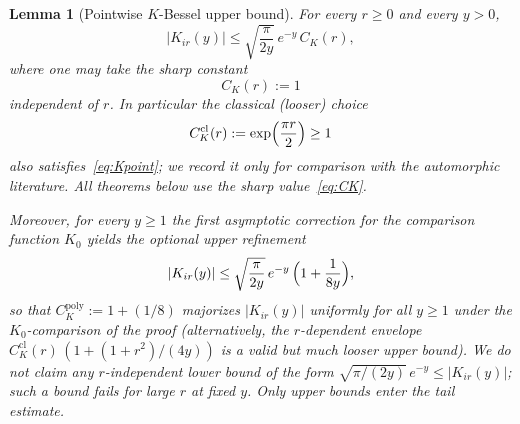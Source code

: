 \documentclass[11pt]{amsart}
\newtheorem{lemma}[theorem]{Lemma}
\theoremstyle{definition}
\newcommand{\abs}[1]{\lvert#1\rvert}
\begin{document}
\begin{lemma}[Pointwise $K$-Bessel upper bound]
\label{lem:Kpoint}
For every $r\ge 0$ and every $y>0$,
\begin{equation}
\label{eq:Kpoint}
  \abs{K_{ir}(y)}
  \le
  \sqrt{\frac{\pi}{2y}}\,e^{-y}\,C_K(r),
\end{equation}
where one may take the sharp constant
\begin{equation}
\label{eq:CK}
  C_K(r)
  :=
  1
\end{equation}
independent of $r$.  In particular the classical (looser) choice
\begin{equation}
\label{eq:CKclass}
  C_K^{\mathrm{cl}}(r)
  :=
  \exp\Bigl(\frac{\pi r}{2}\Bigr)
  \ge 1
\end{equation}
also satisfies~\eqref{eq:Kpoint}; we record it only for comparison with the
automorphic literature.  All theorems below use the sharp value~\eqref{eq:CK}.

Moreover, for every $y\ge 1$ the first asymptotic correction for the
comparison function $K_0$ yields the optional \emph{upper} refinement
\begin{equation}
\label{eq:Luke}
  \abs{K_{ir}(y)}
  \le
  \sqrt{\frac{\pi}{2y}}\,e^{-y}\,
  \Bigl(1+\frac{1}{8y}\Bigr),
\end{equation}
so that $C_K^{\mathrm{poly}}:=1+(1/8)$ majorizes $\abs{K_{ir}(y)}$
uniformly for all $y\ge 1$ under the $K_0$-comparison of the proof
(alternatively, the $r$-dependent envelope
$C_K^{\mathrm{cl}}(r)\,(1+(1+r^2)/(4y))$ is a valid but much looser
upper bound).  We do \emph{not} claim any $r$-independent
\emph{lower} bound of the form $\sqrt{\pi/(2y)}\,e^{-y}\le\abs{K_{ir}(y)}$;
such a bound fails for large $r$ at fixed $y$.  Only upper bounds enter
the tail estimate.
\end{lemma}
\end{document}
